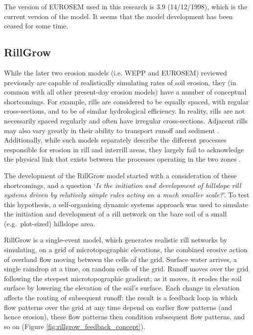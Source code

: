 The version of EUROSEM used in this research is 3.9 (14/12/1998), which is the
current version of the model. It seems that the model development has been
ceased for some time.

\subsection{RillGrow}
\label{sec:ModelDescriptionRillGrow}

While the later two erosion models (i.e. WEPP and EUROSEM) reviewed previously
are capable of realistically simulating rates of soil erosion, they (in common
with all other present-day erosion models) have a number of conceptual
shortcomings. For example, rills are considered to be equally spaced, with
regular cross-sections, and to be of similar hydrological efficiency. In
reality, rills are not necessarily spaced regularly and often have irregular
cross-sections. Adjacent rills may also vary greatly in their ability to
transport runoff and sediment \citep{favis-mortlock1996-248}. Additionally,
while such models separately describe the different processes responsible for
erosion in rill and interrill areas, they largely fail to acknowledge the
physical link that exists between the processes operating in the two zones
\citep{favis-mortlock2000-2173}.

The development of the RillGrow model
\citep{favis-mortlock1996-248,favis-mortlock1998-353,favis-mortlock2000-2173,
favis-mortlock2003-127,favis-mortlock2004-349} started with a consideration of
these shortcomings, and a question `\emph{Is the initiation and development of
hillslope rill systems driven by relatively simple rules acting on a much
smaller scale?}'. To test this hypothesis, a self-organising dynamic systems
approach was used to simulate the initiation and development of a rill network
on the bare soil of a small (e.g.\ plot-sized) hillslope area.

RillGrow is a single-event model, which generates realistic rill networks by
simulating, on a grid of microtopographic elevations, the combined erosive
action of overland flow moving between the cells of the grid. Surface water
arrives, a single raindrop at a time, on random cells of the grid. Runoff moves
over the grid following the steepest microtopographic gradient; as it moves, it
erodes the soil surface by lowering the elevation of the soil's surface. Each
change in elevation affects the routing of subsequent runoff: the result is a
feedback loop in which flow patterns over the grid at any time depend on earlier
flow patterns (and hence erosion), these flow patterns then condition subsequent
flow patterns, and so on (Figure \ref{fig:rillgrow_feedback_concept}).

